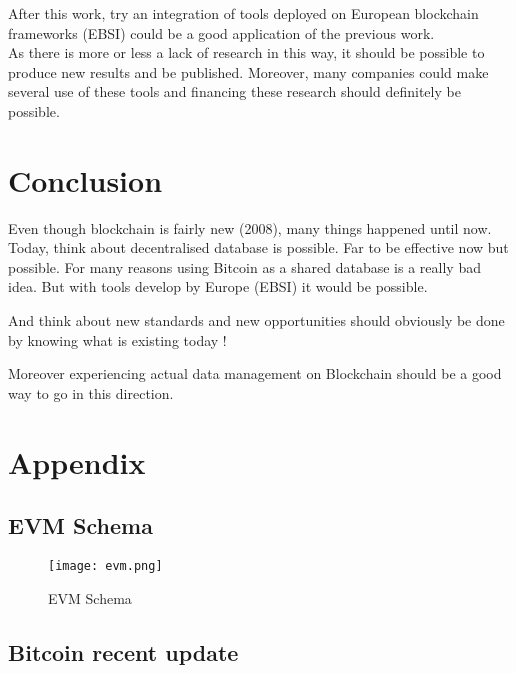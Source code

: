 \documentclass[12pt]{article}
\begin{document}
After this work, try an integration of tools deployed on European blockchain frameworks (EBSI) could be a good application of the previous work.\\

As there is more or less a lack of research in this way, it should be possible to produce new results and be published. Moreover, many companies could make several use of these tools and financing these research should definitely be possible. 



\section{Conclusion}

Even though blockchain is fairly new \cite{whitepaper-btc} (2008), many things happened until now. Today, think about decentralised database is possible. Far to be effective now but possible. For many reasons using Bitcoin as a shared database is a really bad idea. But with tools develop by Europe (EBSI) it would be possible. 

And think about new standards and new opportunities should obviously be done by knowing what is existing today !

Moreover experiencing actual data management on Blockchain should be a good way to go in this direction. 

\newpage

\section*{Appendix}

\subsection*{EVM Schema}

\begin{figure}[h!]
\centering
\texttt{[image: evm.png]}
\caption{EVM Schema \label{evm}}
\end{figure}



\subsection*{Bitcoin recent update\label{bitcoin}}
\end{document}
